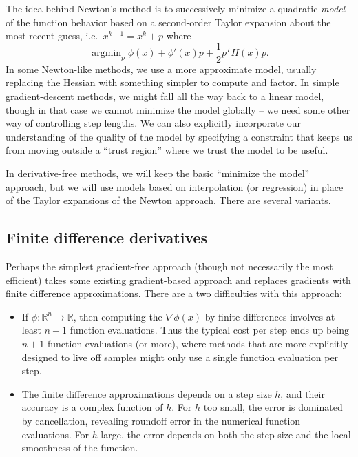 \documentclass[12pt, leqno]{article} %
\providecommand{\tightlist}{%
  \setlength{\itemsep}{0pt}\setlength{\parskip}{0pt}}
\begin{document}
The idea behind Newton's method is to successively minimize a quadratic
\emph{model} of the function behavior based on a second-order Taylor
expansion about the most recent guess, i.e.~\(x^{k+1} = x^k + p\) where
\[\operatorname{argmin}_{p} \phi(x) + \phi'(x) p + \frac{1}{2} p^T H(x) p.\]
In some Newton-like methods, we use a more approximate model, usually
replacing the Hessian with something simpler to compute and factor. In
simple gradient-descent methods, we might fall all the way back to a
linear model, though in that case we cannot minimize the model globally
-- we need some other way of controlling step lengths. We can also
explicitly incorporate our understanding of the quality of the model by
specifying a constraint that keeps us from moving outside a ``trust
region'' where we trust the model to be useful.

In derivative-free methods, we will keep the basic ``minimize the
model'' approach, but we will use models based on interpolation (or
regression) in place of the Taylor expansions of the Newton approach.
There are several variants.

\subsection{Finite difference derivatives}

Perhaps the simplest gradient-free approach (though not necessarily the
most efficient) takes some existing gradient-based approach and replaces
gradients with finite difference approximations. There are a two
difficulties with this approach:

\begin{itemize}
\tightlist
\item
  If \(\phi : \mathbb{R}^n \rightarrow \mathbb{R}\), then computing the
  \(\nabla \phi(x)\) by finite differences involves at least \(n+1\)
  function evaluations. Thus the typical cost per step ends up being
  \(n+1\) function evaluations (or more), where methods that are more
  explicitly designed to live off samples might only use a single
  function evaluation per step.
\item
  The finite difference approximations depends on a step size \(h\), and
  their accuracy is a complex function of \(h\). For \(h\) too small,
  the error is dominated by cancellation, revealing roundoff error in
  the numerical function evaluations. For \(h\) large, the error depends
  on both the step size and the local smoothness of the function.
\end{itemize}
\end{document}
